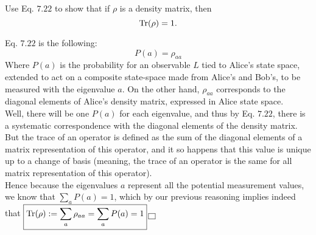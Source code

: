 \documentclass[solutions.tex]{subfiles}
\begin{document}
\maketitle
\begin{exercise} Use Eq. $7.22$ to show that if $\rho$ is a density
matrix, then
\[
	\text{Tr}(\rho) = 1.
\]
\end{exercise}
Eq. $7.22$ is the following:
\[
	P(a) = \rho_{aa}
\]
Where $P(a)$ is the probability for an observable $L$ tied to
Alice's state space, extended to act on a composite state-space
made from Alice's and Bob's, to be measured with the eigenvalue $a$.
On the other hand, $\rho_{aa}$ corresponds to the diagonal elements
of Alice's density matrix, expressed in Alice state space. \\

Well, there will be one $P(a)$ for each eigenvalue, and thus by
Eq. $7.22$, there is a systematic correspondence with the diagonal
elements of the density matrix. But the trace of an operator is
defined as the sum of the diagonal elements of a matrix representation
of this operator, and it so happens that this value is unique up
to a change of basis (meaning, the trace of an operator is the same
for all matrix representation of this operator). \\

Hence because the eigenvalues $a$ represent all the potential measurement
values, we know that $\sum_aP(a) = 1$, which by our previous reasoning
implies indeed that $\boxed{\text{Tr}(\rho) := \sum_a\rho_{aa}= \sum_aP(a) = 1} \,\boxed{\,}$
\end{document}
